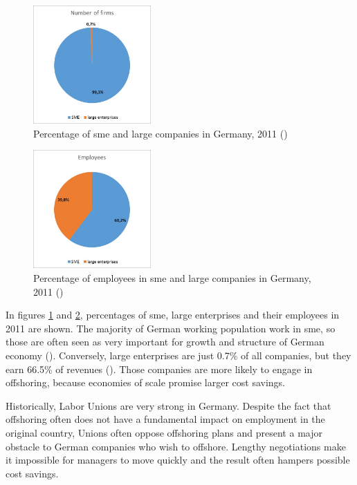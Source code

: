 \begin{figure}[htb]
	\centering
	\includegraphics[width=0.4\textwidth]{Pictures/GER_Company_Size}
	\caption{Percentage of \acrshort{sme} and large companies in Germany, 2011 (\cite[p. 42]{Sollner.2014})}
	\label{fig:GERCompSize}
\end{figure}

\begin{figure}[htb]
	\centering
	\includegraphics[width=0.4\textwidth]{Pictures/GER_Employees}
	\caption{Percentage of employees in \acrshort{sme} and large companies in Germany, 2011 (\cite[p. 42]{Sollner.2014})}
	\label{fig:GEREmployees}
\end{figure}

In figures \ref{fig:GERCompSize} and \ref{fig:GEREmployees}, percentages of \gls{sme}, large enterprises and their employees in 2011 are shown. The majority of German working population work in \gls{sme}, so those are often seen as very important for growth and structure of German economy (\cite[p. 40]{Sollner.2014}). Conversely, large enterprises are just 0.7\% of all companies, but they earn 66.5\% of revenues (\cite[p. 42]{Sollner.2014}). Those companies are more likely to engage in offshoring, because economies of scale promise larger cost savings.

Historically, Labor Unions are very strong in Germany. Despite the fact that offshoring often does not have a fundamental impact on employment in the original country, Unions often oppose offshoring plans and present a major obstacle to German companies who wish to offshore. Lengthy negotiations make it impossible for managers to move quickly and the result often hampers possible cost savings.

